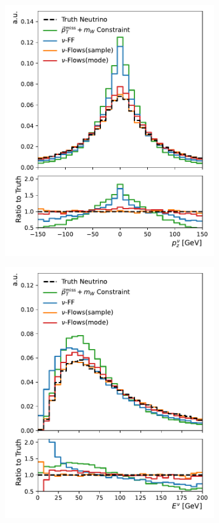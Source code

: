 \begin{figure}[ht]
    \centering
    \begin{subfigure}{0.40\textwidth}
        \includegraphics[width=\textwidth]{Figures/neutrino_unfolding/p_z.pdf}
        \caption{} \label{fig:nu_pz}
    \end{subfigure}
    \begin{subfigure}{0.40\textwidth}
        \includegraphics[width=\textwidth]{Figures/neutrino_unfolding/E.pdf}

\end{subfigure}
\end{figure}
